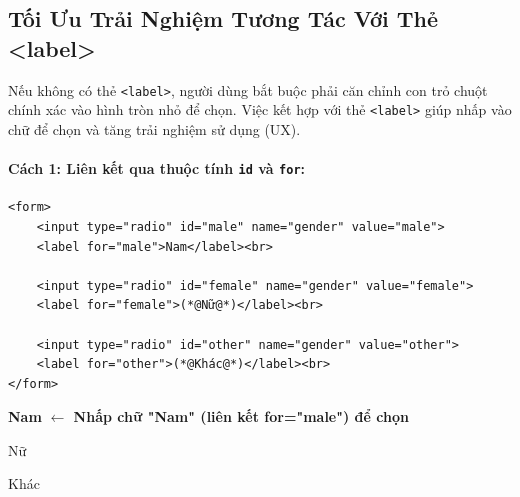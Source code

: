 \documentclass[11pt,oneside]{book}
\newcommand{\codeinline}[1]{\textcolor{accentOrange}{\texttt{#1}}}
\begin{document}
\subsection{Tối Ưu Trải Nghiệm Tương Tác Với Thẻ <label>}

Nếu không có thẻ \codeinline{<label>}, người dùng bắt buộc phải căn chỉnh con trỏ chuột chính xác vào hình tròn nhỏ để chọn. Việc kết hợp với thẻ \codeinline{<label>} giúp nhấp vào chữ để chọn và tăng trải nghiệm sử dụng (UX).

\paragraph{Cách 1: Liên kết qua thuộc tính \codeinline{id} và \codeinline{for}:}
\begin{codeWindow}
\begin{lstlisting}[language=HTML5]
<form>
    <input type="radio" id="male" name="gender" value="male">
    <label for="male">Nam</label><br>
    
    <input type="radio" id="female" name="gender" value="female">
    <label for="female">(*@Nữ@*)</label><br>
    
    <input type="radio" id="other" name="gender" value="other">
    <label for="other">(*@Khác@*)</label><br>
</form>
\end{lstlisting}
\end{codeWindow}

\begin{browserWindow}[Mô Phỏng Trình Duyệt: Tương Tác Chọn Radio Qua Thẻ Label (Liên kết for=id)]
\sffamily\small
{} \; \textbf{Nam} \quad \textcolor{primaryBlue}{\small\textbf{$\leftarrow$ Nhấp chữ "Nam" (liên kết for="male") để chọn}} \\[4pt]
 \; Nữ \\[4pt]
 \; Khác
\end{browserWindow}
\end{document}
